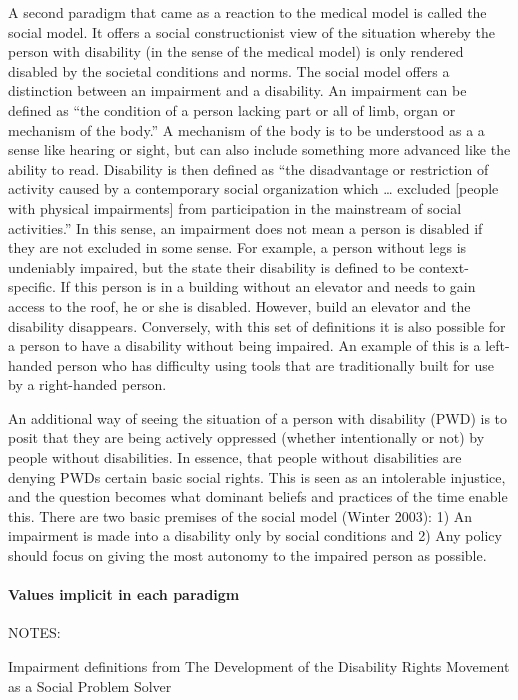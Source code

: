 \documentclass{lps}
\begin{document}
A second paradigm that came as a reaction to the medical model is called the
social model. It offers a social constructionist view of the situation whereby
the person with disability (in the sense of the medical model) is only
rendered  disabled by the societal conditions and norms. The social model
offers a distinction between an impairment and a disability. An impairment can
be defined as “the condition of a person lacking part or all of limb, organ or
mechanism of the body.” A mechanism of the body is to be understood as a a
sense like hearing or sight, but can also include something more advanced like
the ability to read. Disability is then defined as “the disadvantage or
restriction of activity caused by a contemporary social organization which …
excluded [people with physical impairments] from participation in the
mainstream of social activities.” In this sense, an impairment does not mean a
person is disabled if they are not excluded in some sense. For example, a
person without legs is undeniably impaired, but the state their disability is
defined to be context-specific. If this person is in a building without an
elevator and needs to gain access to the roof, he or she is disabled. However,
build an elevator and the disability disappears. Conversely, with this set of
definitions it is also possible for a person to have a disability without
being impaired. An example of this is a left-handed person who has difficulty
using tools that are traditionally built for use by a right-handed person.

An additional way of seeing the situation of a person with disability (PWD) is
to posit that they are being actively oppressed (whether intentionally or not)
by people without disabilities. In essence, that people without disabilities
are denying PWDs certain basic social rights. This is seen as an intolerable
injustice, and the question becomes what dominant beliefs and practices of the
time enable this. There are two basic premises of the social model (Winter
2003): 1) An impairment is made into a disability only by social conditions
and 2) Any policy should focus on giving the most autonomy to the impaired
person as possible.  \paragraph{Values implicit in each paradigm}


NOTES:

Impairment definitions from The Development of the Disability Rights Movement
as a Social Problem Solver 
\end{document}
